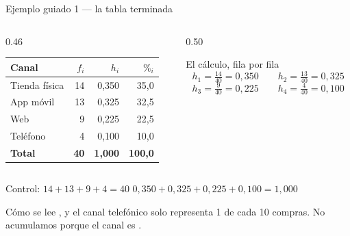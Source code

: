 \documentclass[aspectratio=169,10pt]{beamer}
\begin{document}
\begin{frame}{Ejemplo guiado 1 — la tabla terminada}
  \scriptsize
  \begin{columns}[T,onlytextwidth]
    \begin{column}{0.46\textwidth}
      \centering
      \begin{tabular}{@{}lrrr@{}}
        \toprule
        \textbf{Canal} & \textbf{$f_i$} & \textbf{$h_i$} & \textbf{$\%_i$} \\
        \midrule
        Tienda física & 14 & 0{,}350 & 35{,}0 \\
        App móvil     & 13 & 0{,}325 & 32{,}5 \\
        Web           &  9 & 0{,}225 & 22{,}5 \\
        Teléfono      &  4 & 0{,}100 & 10{,}0 \\
        \midrule
        \textbf{Total} & \textbf{40} & \textbf{1{,}000} & \textbf{100{,}0} \\
        \bottomrule
      \end{tabular}
    \end{column}
    \begin{column}{0.50\textwidth}
      \begin{exampleblock}{El cálculo, fila por fila}
        \scriptsize
        \[ h_1=\tfrac{14}{40}=0{,}350 \qquad h_2=\tfrac{13}{40}=0{,}325 \]
        \[ h_3=\tfrac{9}{40}=0{,}225 \qquad h_4=\tfrac{4}{40}=0{,}100 \]
      \end{exampleblock}
    \end{column}
  \end{columns}

  \vspace{0.15cm}
  {\scriptsize Control: $14+13+9+4=40$ \checkmark \qquad
  $0{,}350+0{,}325+0{,}225+0{,}100=1{,}000$ \checkmark}

  \vspace{0.15cm}
  \begin{alertblock}{Cómo se lee}
    \scriptsize
    ,
    y el canal telefónico solo representa 1 de cada 10 compras. No acumulamos
    porque el canal es .
  \end{alertblock}
\end{frame}
\end{document}
